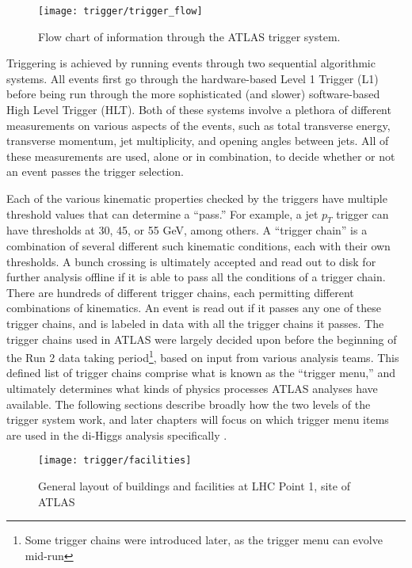     \begin{figure}[h]
        \texttt{[image: trigger/trigger\_flow]}
        \caption{Flow chart of information through the ATLAS trigger system\cite{trigger_run2}.}
        \label{fig:trigger_flow}
    \end{figure}
    
    Triggering is achieved by running events through two sequential algorithmic systems.
    All events first go through the hardware-based Level 1 Trigger (L1) before being run through the more sophisticated (and slower) software-based High Level Trigger (HLT).
    Both of these systems involve a plethora of different measurements on various aspects of the events, such as total transverse energy, transverse momentum, jet multiplicity, and opening angles between jets.
    All of these measurements are used, alone or in combination, to decide whether or not an event passes the trigger selection.

    Each of the various kinematic properties checked by the triggers have multiple threshold values that can determine a ``pass.''
    For example, a jet $p_T$ trigger can have thresholds at 30, 45, or 55 GeV, among others.
    A ``trigger chain'' is a combination of several different such kinematic conditions, each with their own thresholds.
    A bunch crossing is ultimately accepted and read out to disk for further analysis offline if it is able to pass all the conditions of a trigger chain.
    There are hundreds of different trigger chains, each permitting different combinations of kinematics.
    An event is read out if it passes any one of these trigger chains, and is labeled in data with all the trigger chains it passes.
    The trigger chains used in ATLAS were largely decided upon before the beginning of the Run 2 data taking period\footnote{
        Some trigger chains were introduced later, as the trigger menu can evolve mid-run
        }, based on input from various analysis teams.
    This defined list of trigger chains comprise what is known as the ``trigger menu,'' and ultimately determines what kinds of physics processes ATLAS analyses have available.
    The following sections describe broadly how the two levels of the trigger system work, and later chapters will focus on which trigger menu items are used in the di-Higgs analysis specifically .

    \begin{figure}[h]
        \texttt{[image: trigger/facilities]}
        \caption{General layout of buildings and facilities at LHC Point 1, site of ATLAS \cite{trigger_tdr}}
        \label{fig:facilities}
    \end{figure}


